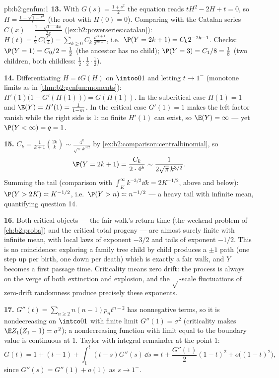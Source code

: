 \begin{solution}{pb:b2:genfun:1}
\textbf{13.} With $G(s) = \frac{1 + s^2}2$ the equation reads
$tH^2 - 2H + t = 0$, so $H = \frac{1 - \sqrt{1 - t^2}}{t}$
(the root with $H(0) = 0$). Comparing with the Catalan series
$C(x) = \frac{1 - \sqrt{1 - 4x}}{2x}$
(\cref{ex:b2:powerseries:catalan}): $H(t) = \frac
t2\,C\bigl(\frac{t^2}4\bigr) =
\sum_{k\geq0}C_k\,\frac{t^{2k+1}}{2^{2k+1}}$, i.e.\ $\P(Y =
2k+1) = C_k2^{-2k-1}$. Checks: $\P(Y = 1) = C_0/2 = \frac12$
(the ancestor has no child); $\P(Y = 3) = C_1/8 = \frac18$
(two children, both childless: $\frac12\cdot\frac12\cdot
\frac12$).

\textbf{14.} Differentiating $H = tG(H)$ on $\intoo01$ and
letting $t \to 1^-$ (monotone limits as in
\cref{thm:b2:genfun:moments}): $H'(1)\bigl(1 - G'(H(1))\bigr)
= G(H(1))$. In the subcritical case $H(1) = 1$ and $\E(Y) =
H'(1) = \frac1{1 - m}$. In the critical case $G'(1) = 1$
makes the left factor vanish while the right side is $1$: no
finite $H'(1)$ can exist, so $\E(Y) = \infty$ --- yet $\P(Y <
\infty) = q = 1$.

\textbf{15.} $C_k = \frac1{k+1}\binom{2k}k \sim
\frac{4^k}{\sqrt\pi\,k^{3/2}}$ by
\cref{ex:b2:comparison:centralbinomial}, so
\[
\P(Y = 2k+1) = \frac{C_k}{2\cdot4^{k}} \sim
\frac1{2\sqrt\pi\,k^{3/2}} .
\]
Summing the tail (comparison with $\int_K^\infty
k^{-3/2}\dd k = 2K^{-1/2}$, above and below): $\P(Y > 2K)
\asymp K^{-1/2}$, i.e.\ $\P(Y > n) \asymp n^{-1/2}$ --- a
heavy tail with infinite mean, quantifying question 14.

\textbf{16.} Both critical objects --- the fair walk's return
time (the weekend problem of \cref{ch:b2:proba}) and the
critical total progeny --- are almost surely finite with
infinite mean, with local laws of exponent $-3/2$ and tails
of exponent $-1/2$. This is no coincidence: exploring a
family tree child by child produces a $\pm1$ path (one step
up per birth, one down per death) which is exactly a fair
walk, and $Y$ becomes a first passage time. Criticality means
zero drift: the process is always on the verge of both
extinction and explosion, and the $\sqrt{}$-scale
fluctuations of zero-drift randomness produce precisely these
exponents.

\textbf{17.} $G''(t) = \sum_{n\geq2}n(n-1)p_nt^{n-2}$ has
nonnegative terms, so it is nondecreasing on $\intco01$ with
finite limit $G''(1) = \sigma^2$ (criticality makes
$\E Z_1(Z_1 - 1) = \sigma^2$); a nondecreasing function with
limit equal to the boundary value is continuous at $1$.
Taylor with integral remainder at the point $1$:
\[
G(t) = 1 + (t - 1) + \int_1^t(t - s)G''(s)\,\dd s
= t + \frac{G''(1)}2(1-t)^2 + o\bigl((1-t)^2\bigr),
\]
since $G''(s) = G''(1) + o(1)$ as $s \to 1^-$.


\end{solution}
